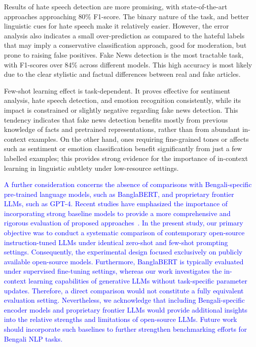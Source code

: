 \documentclass[10pt,letterpaper]{article}
\newcommand{\rev}[1]{\textcolor{blue}{#1}}
\begin{document}
Results of hate speech detection are more promising, with state-of-the-art approaches approaching 80\% F1-score. The binary nature of the task, and better linguistic cues for hate speech make it relatively easier. However, the error analysis also indicates a small over-prediction as compared to the hateful labels that may imply a conservative classification approach, good for moderation, but prone to raising false positives. Fake News detection is the most tractable task, with F1-scores over 84\% across different models. This high accuracy is most likely due to the clear stylistic and factual differences between real and fake articles.

Few-shot learning effect is task-dependent. It proves effective for sentiment analysis, hate speech detection, and emotion recognition consistently, while its impact is constrained or slightly negative regarding fake news detection. This tendency indicates that fake news detection benefits mostly from previous knowledge of facts and pretrained representations, rather than from abundant in-context examples. On the other hand, ones requiring fine-grained tones or affects such as sentiment or emotion classification benefit significantly from just a few labelled examples; this provides strong evidence for the importance of in-context learning in linguistic subtlety under low-resource settings.

\rev{A further consideration concerns the absence of comparisons with Bengali-specific pre-trained language models, such as BanglaBERT, and proprietary frontier LLMs, such as GPT-4. Recent studies have emphasized the importance of incorporating strong baseline models to provide a more comprehensive and rigorous evaluation of proposed approaches~\cite{b49,b50,b51,b52,b53}. In the present study, our primary objective was to conduct a systematic comparison of contemporary open-source instruction-tuned LLMs under identical zero-shot and few-shot prompting settings. Consequently, the experimental design focused exclusively on publicly available open-source models. Furthermore, BanglaBERT is typically evaluated under supervised fine-tuning settings, whereas our work investigates the in-context learning capabilities of generative LLMs without task-specific parameter updates. Therefore, a direct comparison would not constitute a fully equivalent evaluation setting. Nevertheless, we acknowledge that including Bengali-specific encoder models and proprietary frontier LLMs would provide additional insights into the relative strengths and limitations of open-source LLMs. Future work should incorporate such baselines to further strengthen benchmarking efforts for Bengali NLP tasks.}
\end{document}

